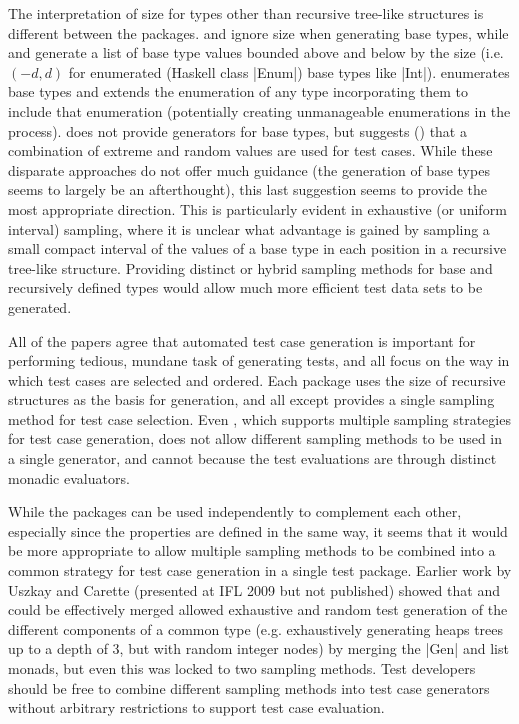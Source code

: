 The interpretation of size for types other than recursive tree-like structures
is different between the packages.
\QC and \EC ignore  size when generating base types,
while \SC and \LSC generate a list of base type values  
bounded above and below by the size
(i.e. $\left(-d,d\right)$ for enumerated (Haskell class |Enum|) base types like |Int|).
\FEAT enumerates base types and extends the enumeration of
any type incorporating them to include that enumeration
(potentially creating unmanageable enumerations in the process).
\GAST does not provide generators for base types,
but suggests (\cite{GAST2002}) that a combination of extreme and random values 
are used for test cases.
While these disparate approaches do not offer much guidance
(the generation of base types seems to largely be an afterthought),
this last suggestion seems to provide the most appropriate direction.
This is particularly evident in exhaustive (or uniform interval) sampling,
where it is unclear what advantage is gained by sampling a small compact interval
of the values of a base type in each position in a recursive tree-like structure.
Providing distinct or hybrid sampling methods for base and recursively defined types
would allow much more efficient test data sets to be generated.

All of the papers agree that automated test case generation is important for
performing tedious, mundane task of generating tests,
and all focus on the way in which test cases are selected and ordered.
Each package uses the size of recursive structures as the basis for generation,
and all except \FEAT provides a single sampling method for test case selection.
Even \FEAT, which supports multiple sampling strategies for test case generation,
does not allow different sampling methods to be used in a single generator,
and cannot because the test evaluations are through distinct monadic evaluators.

While the packages can be used independently to complement each other,
especially since the properties are defined in the same way,
it seems that it would be more appropriate to allow
multiple sampling methods to be combined into 
a common strategy for test case generation
in a single test package.
Earlier work by Uszkay and Carette (presented at IFL 2009 but not published)
showed that \QC and \SC could be effectively merged
allowed exhaustive and random test generation
of the different components of a common type
(e.g. exhaustively generating heaps trees up to a depth of 3, 
but with random integer nodes)
by merging the |Gen| and list monads,
but even this was locked to two sampling methods.
Test developers should be free to combine different sampling methods into test case generators without arbitrary restrictions to support test case evaluation.

